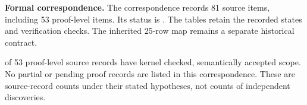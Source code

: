 \textbf{Formal correspondence.} The correspondence records 81 source items, including 53 proof-level items. Its status is . The tables retain the recorded states and verification checks. The inherited 25-row map remains a separate historical contract.
\par{} of 53 proof-level source records have kernel checked, semantically accepted scope. No partial or pending proof records are listed in this correspondence. These are source-record counts under their stated hypotheses, not counts of independent discoveries.
